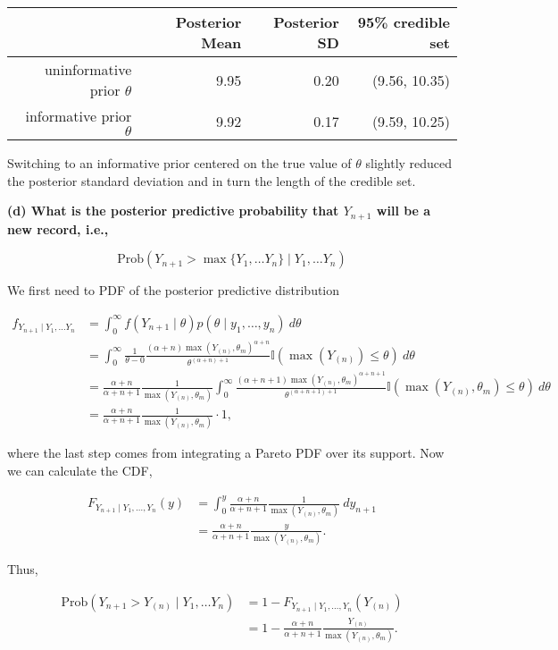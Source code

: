 \documentclass[
]{article}
\begin{document}
\begin{longtable}[]{@{}rrrr@{}}
\toprule
& Posterior Mean & Posterior SD & 95\% credible set\tabularnewline
\midrule
\endhead
uninformative prior \(\theta\) & 9.95 & 0.20 & (9.56,
10.35)\tabularnewline
informative prior \(\theta\) & 9.92 & 0.17 & (9.59,
10.25)\tabularnewline
\bottomrule
\end{longtable}

Switching to an informative prior centered on the true value of
\(\theta\) slightly reduced the posterior standard deviation and in turn
the length of the credible set.

\textbf{(d) What is the posterior predictive probability that
\(Y_{n+1}\) will be a new record, i.e.,}

\[
\text{Prob}(Y_{n+1} > \max\{ Y_{1}, \dots Y_{n} \} \mid Y_{1}, \dots Y_{n})
\]

We first need to PDF of the posterior predictive distribution

\begin{align*}
f_{Y_{n+1} \mid Y_{1}, \dots Y_{n}} & = \int_{0}^{\infty} f(Y_{n+1} \mid \theta) p(\theta \mid y_{1}, \dots , y_{n}) \ d\theta \\
  & = \int_{0}^{\infty} \frac{  1}{\theta - 0 } \frac{ (\alpha+n) \max(Y_{(n)}, \theta_{m})^{\alpha+n} }{  \theta^{(\alpha+n)+1}} \mathbb{I}(\max(Y_{(n)}) \leq \theta) \ d\theta \\
  & = \frac{\alpha + n  }{\alpha+ n +1  } \frac{1  }{ \max(Y_{(n)}, \theta_{m}) } \int_{0}^{\infty} \frac{(\alpha+n+1)\max(Y_{(n)} ,\theta_{m})^{\alpha+n+1}  }{  \theta^{(\alpha+n+1)+1}} \mathbb{I}(\max(Y_{(n)}, \theta_{m}) \leq \theta) \ d\theta \\
   & = \frac{\alpha + n  }{\alpha+ n +1  } \frac{1  }{ \max(Y_{(n)}, \theta_{m}) } \cdot 1,
\end{align*}

where the last step comes from integrating a Pareto PDF over its
support. Now we can calculate the CDF,

\begin{align*}
F_{Y_{n+1}\mid Y_{1} , \dots,Y_{n}}(y) & = \int_{0}^{y} \frac{\alpha + n  }{\alpha+ n +1  } \frac{1  }{ \max(Y_{(n)}, \theta_{m}) } \ dy_{n+1} \\
  & = \frac{\alpha + n  }{\alpha+ n +1  } \frac{y  }{ \max(Y_{(n)}, \theta_{m}) }.
\end{align*}

Thus,

\begin{align*}
\text{Prob}(Y_{n+1} > Y_{(n)} \mid Y_{1}, \dots Y_{n}) & = 1-F_{Y_{n+1}\mid Y_{1} , \dots,Y_{n}}(Y_{(n)}) \\
  & = 1 - \frac{\alpha +n  }{ \alpha + n + 1 } \frac{ Y_{(n)} }{  \max(Y_{(n)}, \theta_{m})}.
\end{align*}
\end{document}
